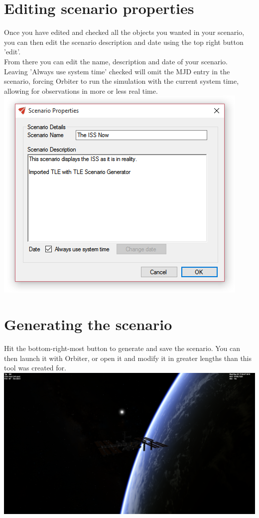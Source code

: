 \documentclass[a4paper]{article}
\begin{document}
		\section{Editing scenario properties}
			Once you have edited and checked all the objects you wanted in your scenario, you can then edit the scenario description and date using the top right button 'edit'.\\
			From there you can edit the name, description and date of your scenario.\\
			Leaving 'Always use system time' checked will omit the MJD entry in the scenario, forcing Orbiter to run the simulation with the current system time, allowing for observations in more or less real time.\\
			\includegraphics[scale=1]{scn_properties.png}
			
		\section{Generating the scenario}
			Hit the bottom-right-most button to generate and save the scenario. You can then launch it with Orbiter, or open it and modify it in greater lengths than this tool was created for.\\
			\includegraphics[width=\linewidth]{scn_result.png}
			
\end{document}

